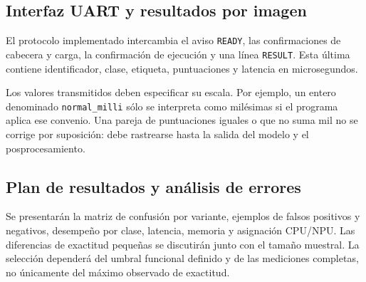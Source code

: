 \subsection{Interfaz UART y resultados por imagen}
El protocolo implementado intercambia el aviso \texttt{READY}, las confirmaciones de cabecera y carga, la confirmación de ejecución y una línea \texttt{RESULT}. Esta última contiene identificador, clase, etiqueta, puntuaciones y latencia en microsegundos.

Los valores transmitidos deben especificar su escala. Por ejemplo, un entero denominado \texttt{normal\_milli} sólo se interpreta como milésimas si el programa aplica ese convenio. Una pareja de puntuaciones iguales o que no suma mil no se corrige por suposición: debe rastrearse hasta la salida del modelo y el posprocesamiento.

\subsection{Plan de resultados y análisis de errores}
Se presentarán la matriz de confusión por variante, ejemplos de falsos positivos y negativos, desempeño por clase, latencia, memoria y asignación CPU/NPU. Las diferencias de exactitud pequeñas se discutirán junto con el tamaño muestral. La selección dependerá del umbral funcional definido y de las mediciones completas, no únicamente del máximo observado de exactitud.
